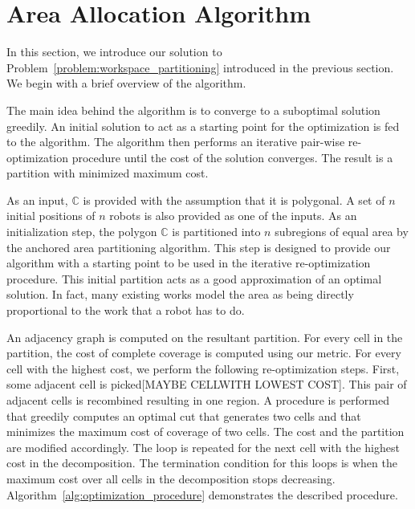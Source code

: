 \documentclass[../main.tex]{subfiles}
\begin{document}
\section{Area Allocation Algorithm}
\label{sec:area_allocation_algo}
In this section, we introduce our solution to Problem~\ref{problem:workspace_partitioning} introduced in the previous section. We begin with a brief overview of the algorithm.

The main idea behind the algorithm is to converge to a suboptimal solution greedily. An initial solution to act as a starting point for the optimization is fed to the algorithm. The algorithm then performs an iterative pair-wise re-optimization procedure until the cost of the solution converges. The result is a partition with minimized maximum cost. 

As an input, $\mathbb{C}$ is provided with the assumption that it is polygonal. A set of $n$ initial positions of $n$ robots is also provided as one of the inputs. As an initialization step, the polygon $\mathbb{C}$ is partitioned into $n$ subregions of equal area by the anchored area partitioning algorithm. This step is designed to provide our algorithm  with a starting point to be used in the iterative re-optimization procedure. This initial partition acts as a good approximation of an optimal solution. In fact, many existing works model the area as being directly proportional to the work that a robot has to do.

An adjacency graph is computed on the resultant partition. For every cell in the partition, the cost of complete coverage is computed using our metric. For every cell with the highest cost, we perform the following re-optimization steps. First, some adjacent cell is picked[MAYBE CELLWITH LOWEST COST]. This pair of adjacent cells is recombined resulting in one region. A procedure is performed that greedily computes an optimal cut that generates two cells and that minimizes the maximum cost of coverage of two cells. The cost and the partition are modified accordingly. The loop is repeated for the next cell with the highest cost in the decomposition. The termination condition for this loops is when the maximum cost over all cells in the decomposition stops decreasing. Algorithm~\ref{alg:optimization_procedure} demonstrates the described procedure.
\end{document}
